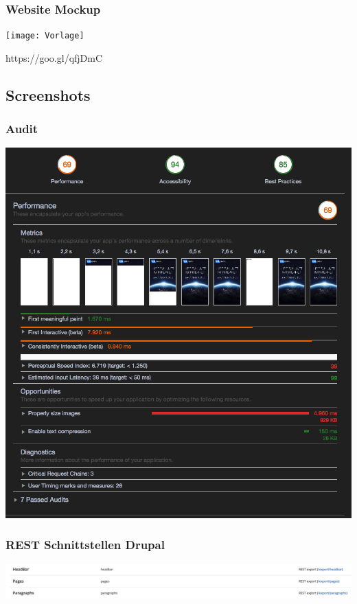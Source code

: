 \documentclass[11pt,a4paper]{article}
\begin{document}
\begin{appendices}
\subsubsection{Website Mockup}
\centering
\texttt{[image: Vorlage]}
\caption{https://goo.gl/qfjDmC}
\flushleft


\subsection{Screenshots}
\subsubsection{Audit}
\label{sec:audit}
\includegraphics[scale=0.5]{audit}
\subsubsection{REST Schnittstellen Drupal}
\label{sec:rest}
\includegraphics[width=16cm]{Rest}

\end{appendices}
\end{document}
